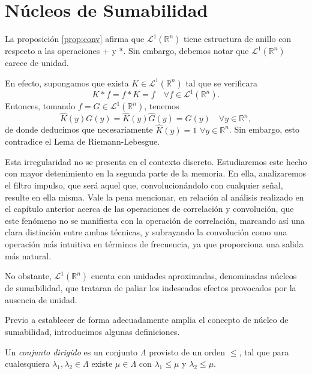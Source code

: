 \section{Núcleos de Sumabilidad}
La proposición \ref{prop:conv} afirma que $\mathscr{L}^1(\mathbb{R}^n)$ tiene estructura de anillo con respecto a las operaciones $+$ y $*$. Sin embargo, debemos notar que $\mathscr{L}^1(\mathbb{R}^n)$ carece de unidad. 

\noindent En efecto, supongamos que exista $K \in \mathscr{L}^1(\mathbb{R}^n)$ tal que se verificara 
\begin{equation}
    K * f = f * K = f \quad \forall f \in \mathscr{L}^1(\mathbb{R}^n).
\end{equation}
Entonces, tomando $f = G \in \mathscr{L}^1(\mathbb{R}^n)$, tenemos
\begin{equation}
   \widehat{K}(y)G(y) =  \widehat{K}(y)\widehat{G}(y) = G(y) \quad \forall y \in \mathbb{R}^n,
\end{equation}
de donde deducimos que necesariamente $\widehat{K}(y) = 1 \, \, \forall y \in \mathbb{R}^n$. Sin embargo, esto contradice el Lema de Riemann-Lebesgue.

\noindent Esta irregularidad no se presenta en el contexto discreto. Estudiaremos este hecho con mayor detenimiento en la segunda parte de la memoria. En ella, analizaremos el filtro impulso, que será aquel que, convolucionándolo con cualquier señal, resulte en ella misma. Vale la pena mencionar, en relación al análisis realizado en el capítulo anterior acerca de las operaciones de correlación y convolución, que este fenómeno no se manifiesta con la operación de correlación, marcando así una clara distinción entre ambas técnicas, y subrayando la convolución como una operación más intuitiva en términos de frecuencia, ya que proporciona una salida más natural.


\noindent No obstante, $\mathscr{L}^1(\mathbb{R}^n)$ cuenta con unidades aproximadas, denominadas núcleos de sumabilidad, que trataran de paliar los indeseados efectos provocados por la ausencia de unidad.

\noindent Previo a establecer de forma adecuadamente amplia el concepto de núcleo de sumabilidad, introducimos algunas definiciones.

\begin{definicion}
   Un \textit{conjunto dirigido} es un conjunto $\Lambda$ provisto de un orden $\leq$, tal que para cualesquiera $\lambda_1,\lambda_2 \in \Lambda$ existe $\mu \in \Lambda$ con $\lambda_1\leq \mu$ y  $\lambda_2\leq \mu$.
\end{definicion}

